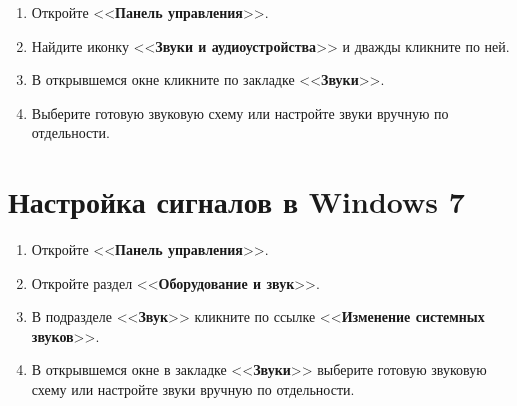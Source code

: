 \documentclass[12pt, a4paper, twocolumn]{book}
\newcommand{\CTL}[1]{<<{\bf #1}>>}
\begin{document}
\begin{enumerate}

\item Откройте \CTL{Панель управления}.

\item Найдите иконку \CTL{Звуки и аудиоустройства} и дважды кликните по ней.

\item В открывшемся окне кликните по закладке \CTL{Звуки}.

\item Выберите готовую звуковую схему или настройте звуки вручную по отдельности.

\end{enumerate}

\section*{Настройка сигналов в Windows 7}

\begin{enumerate}

\item Откройте \CTL{Панель управления}.

\item Откройте раздел \CTL{Оборудование и звук}.

\item В подразделе \CTL{Звук} кликните по ссылке \CTL{Изменение системных звуков}.

\item В открывшемся окне в закладке \CTL{Звуки} выберите готовую звуковую схему или настройте звуки вручную по отдельности.

\end{enumerate}
\end{document}
